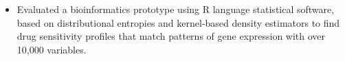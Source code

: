 \documentclass[10pt,a4paper]{altacv}
\begin{document}
\medskip




\begin{itemize}
  \item \small{Evaluated a bioinformatics prototype using R language statistical software, based on distributional entropies and kernel-based density estimators to find drug sensitivity profiles that match patterns of gene expression with over 10,000 variables.}
\end{itemize}







\end{document}
